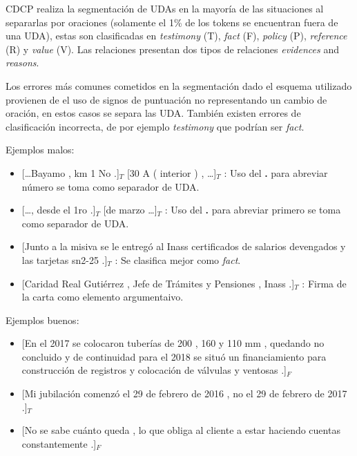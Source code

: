 CDCP realiza la segmentación de UDAs en la mayoría de las situaciones al separarlas por oraciones 
(solamente el 1\% de los tokens se encuentran fuera de una UDA),
estas son clasificadas en \emph{testimony} (T), \emph{fact} (F), \emph{policy} (P), \emph{reference} (R)
y \emph{value} (V). Las relaciones presentan dos tipos de relaciones \emph{evidences} and \emph{reasons}.

Los errores más comunes cometidos en la segmentación dado el esquema utilizado provienen de el uso 
de signos de puntuación no representando un cambio de oración, en estos casos se separa las UDA. También
existen errores de clasificación incorrecta, de por ejemplo \emph{testimony} que podrían ser \emph{fact}.

Ejemplos malos:
\begin{itemize}
	\item \text{} [\dots Bayamo , km 1 No .]$_T$ [30 A ( interior ) , \dots]$_T$ 
	: Uso del \textbf{.} para abreviar número se toma como separador de UDA. %
	\item \text{} [\dots , desde el 1ro .]$_T$ [de marzo \dots]$_T$ 
	: Uso del \textbf{.} para abreviar primero se toma como separador de UDA. %
	\item \text{} [Junto a la misiva se le entregó al Inass certificados de salarios devengados y las tarjetas sn2-25 .]$_T$ 
	: Se clasifica mejor como \emph{fact}. %
	\item \text{} [Caridad Real Gutiérrez , Jefe de Trámites y Pensiones , Inass .]$_T$ 
	: Firma de la carta como elemento argumentaivo. %
\end{itemize}

Ejemplos buenos:
\begin{itemize}
	\item \text{} [En el 2017 se colocaron tuberías de 200 , 160 y 110 mm , quedando no concluido y de 
	continuidad para el 2018 se situó un financiamiento para construcción de registros y colocación de 
	válvulas y ventosas .]$_F$ %
	\item \text{} [Mi jubilación comenzó el 29 de febrero de 2016 , no el 29 de febrero de 2017 .]$_T$ %
	\item \text{} [No se sabe cuánto queda , lo que obliga al cliente a estar haciendo cuentas constantemente .]$_F$ %
\end{itemize}

